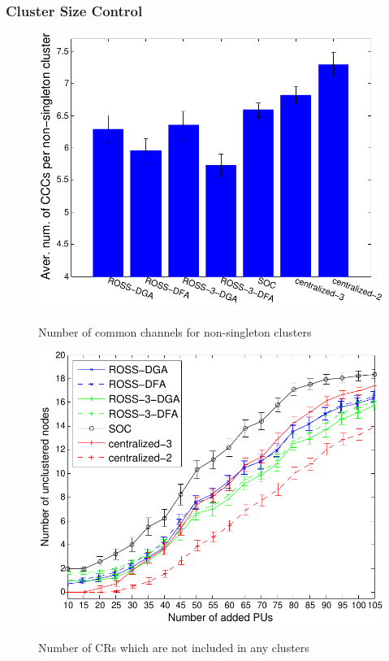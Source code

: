 \documentclass[10pt,journal,compsoc]{IEEEtran}
\theoremstyle{mytheoremstyle}
\theoremstyle{mytheoremstyle}
\theoremstyle{mytheoremstyle}
\begin{document}
\subsubsection{Cluster Size Control}
\label{cluster_size}


\begin{figure}[t]
\begin{multicols}{3}
    \includegraphics[width=\linewidth]{ccc_20.pdf}\par\caption{Number of common channels for non-singleton clusters}\label{ccc_per_nonsingleton}
    \includegraphics[width=\linewidth]{survival_rate_20.pdf}\par\caption{Number of CRs which are not included in any clusters}\label{singleton_clusters}

\end{multicols}
\end{figure}
\end{document}
